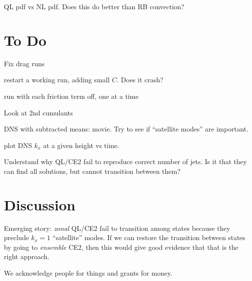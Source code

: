 \documentclass{jfm}
\newcommand{\cmark}{\ding{51}}%
\newcommand{\done}{\rlap{$\square$}{\raisebox{2pt}{\large\hspace{1pt}\cmark}}%
\hspace{-2.5pt}}
\begin{document}
QL pdf vs NL pdf.
Does this do better than RB convection?

\section{To Do}
\label{sec:todo}

\begin{todolist}
  \item Fix drag runs
    \begin{todolist}
      \item[\done] restart a working run, adding small $C$. Does it crash?
      \item run with each friction term off, one at a time
    \end{todolist}
  \item Look at 2nd cumulants
  \item DNS with subtracted means: movie. Try to see if ``satellite modes'' are important.
  \item plot DNS $k_x$ at a given height vs time.
  \item Understand why QL/CE2 fail to reproduce correct number of jets. Is it that they can find all solutions, but cannot transition between them?
\end{todolist}

\section{Discussion}
\label{sec:discussion}

Emerging story: \emph{zonal} QL/CE2 fail to transition among states because they preclude $k_x = 1$ ``satellite'' modes. If we can restore the transition between states by going to \emph{ensemble} CE2, then this would give good evidence that that is the right approach.


We acknowledge people for things and grants for money. 



\end{document}
